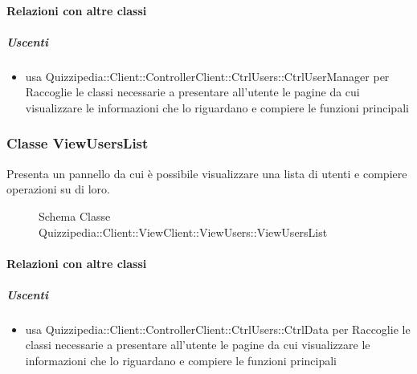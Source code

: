 \paragraph{Relazioni con altre classi}
\subparagraph{Uscenti}
\begin{itemize}
\item usa Quizzipedia::Client::ControllerClient::CtrlUsers::CtrlUserManager per Raccoglie le classi necessarie a presentare all'utente le pagine da cui visualizzare le informazioni che lo riguardano e compiere le funzioni principali
\end{itemize}
\subsubsection{Classe ViewUsersList}
Presenta un pannello da cui è possibile visualizzare una lista di utenti e compiere operazioni su di loro.
\begin{figure}[H]
\centering
\noindent{}
\caption[Schema Classe ViewUsersList]{Schema Classe Quizzipedia::Client::ViewClient::ViewUsers::ViewUsersList}
\end{figure}
\paragraph{Relazioni con altre classi}
\subparagraph{Uscenti}
\begin{itemize}
\item usa Quizzipedia::Client::ControllerClient::CtrlUsers::CtrlData per Raccoglie le classi necessarie a presentare all'utente le pagine da cui visualizzare le informazioni che lo riguardano e compiere le funzioni principali
\end{itemize}
